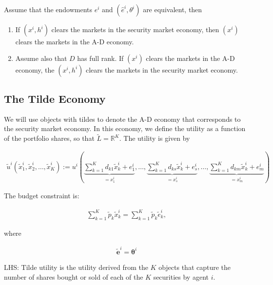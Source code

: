 \documentclass[10pt]{article}
\begin{document}
\begin{proposition} 
    Assume that the endowments $e^i$ and $\left(\hat{e}^i, \theta^i\right)$ are equivalent, then
    
    \begin{enumerate}
        \item If $\left(x^i, h^i\right)$ clears the markets in the security market economy, then $\left(x^i\right)$ clears the markets in the A-D economy.
        \item Assume also that $D$ has full rank. 
        If $\left(x^i\right)$ clears the markets in the A-D economy, 
        the $\left(x^i, h^i\right)$ clears the markets in the security market economy.
    \end{enumerate}

\end{proposition}

\subsection{The Tilde Economy}

We will use objects with tildes to denote the A-D economy that 
corresponds to the security market economy. In this economy,
we define the utility as a function of the portfolio shares, 
so that $\tilde{L}=\mathbb{R}^K$. The utility is given by

\begin{align}
    \tilde{u}^i\left(\tilde{x}_1^i, \tilde{x}_2^i, \ldots, \tilde{x}_K^i\right):=u^i\left(\underbrace{\sum_{k=1}^K d_{k 1} \tilde{x}_k^i+e_1^i}_{=x_1^i}, \ldots, \underbrace{\sum_{k=1}^K d_{k s} \tilde{x}_k^i+e_s^i}_{=x_s^i}, \ldots, \underbrace{\sum_{k=1}^K d_{k m} \tilde{x}_k^i+e_m^i}_{=x_m^i}\right)
\end{align}

The budget constraint is:

\begin{align}
    \sum_{k=1}^K \tilde{p}_k \tilde{x}_k^i=\sum_{k=1}^K \tilde{p}_k \tilde{e}_k^i,
\end{align}

where 

\begin{align}
    \tilde{\mathbf{e}}^i=\boldsymbol{\theta}^i
\end{align}

LHS: Tilde utility is the utility derived from the $K$ 
objects that capture the number of shares bought or sold of each of the 
$K$ securities by agent $i$.
\end{document}
